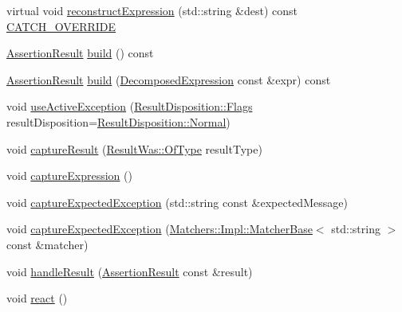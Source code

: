 \begin{DoxyCompactItemize}
\item 
virtual void \mbox{\hyperlink{class_catch_1_1_result_builder_a7d94b15cf04301a8617e7b16158b5d82}{reconstruct\+Expression}} (std\+::string \&dest) const \mbox{\hyperlink{catch_8hpp_a8ecdce4d3f57835f707915ae831eb847}{C\+A\+T\+C\+H\+\_\+\+O\+V\+E\+R\+R\+I\+DE}}
\item 
\mbox{\hyperlink{class_catch_1_1_assertion_result}{Assertion\+Result}} \mbox{\hyperlink{class_catch_1_1_result_builder_a4fc96e7bb8b5f7119a8e79692ec97808}{build}} () const
\item 
\mbox{\hyperlink{class_catch_1_1_assertion_result}{Assertion\+Result}} \mbox{\hyperlink{class_catch_1_1_result_builder_a475d19a04c5d10a5a87cbb85447b59da}{build}} (\mbox{\hyperlink{struct_catch_1_1_decomposed_expression}{Decomposed\+Expression}} const \&expr) const
\item 
void \mbox{\hyperlink{class_catch_1_1_result_builder_a5bbd2f14a678f3e8d0f791ac6d233d65}{use\+Active\+Exception}} (\mbox{\hyperlink{struct_catch_1_1_result_disposition_a3396cad6e2259af326b3aae93e23e9d8}{Result\+Disposition\+::\+Flags}} result\+Disposition=\mbox{\hyperlink{struct_catch_1_1_result_disposition_a3396cad6e2259af326b3aae93e23e9d8af3bd52347ed6f8796e8ce2f77bb39ea5}{Result\+Disposition\+::\+Normal}})
\item 
void \mbox{\hyperlink{class_catch_1_1_result_builder_a10e467f7b7a4976e5d148b4d5066e8fd}{capture\+Result}} (\mbox{\hyperlink{struct_catch_1_1_result_was_a624e1ee3661fcf6094ceef1f654601ef}{Result\+Was\+::\+Of\+Type}} result\+Type)
\item 
void \mbox{\hyperlink{class_catch_1_1_result_builder_af2ae2343965802eeeb0abbd4ea9d2d36}{capture\+Expression}} ()
\item 
void \mbox{\hyperlink{class_catch_1_1_result_builder_a9ac96f6220c8dd8e4feee725c6228d77}{capture\+Expected\+Exception}} (std\+::string const \&expected\+Message)
\item 
void \mbox{\hyperlink{class_catch_1_1_result_builder_a2d6a194258f07f212fef098c0201038a}{capture\+Expected\+Exception}} (\mbox{\hyperlink{struct_catch_1_1_matchers_1_1_impl_1_1_matcher_base}{Matchers\+::\+Impl\+::\+Matcher\+Base}}$<$ std\+::string $>$ const \&matcher)
\item 
void \mbox{\hyperlink{class_catch_1_1_result_builder_ad8bb17e4ac590b75bf8630d8f3502f4e}{handle\+Result}} (\mbox{\hyperlink{class_catch_1_1_assertion_result}{Assertion\+Result}} const \&result)
\item 
void \mbox{\hyperlink{class_catch_1_1_result_builder_a3085cdc46533d45bed6f652a2ac295c0}{react}} ()

\end{DoxyCompactItemize}
